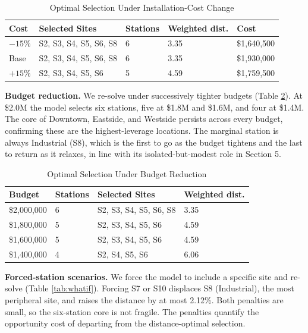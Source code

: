 \documentclass[12pt]{article}
\begin{document}
\begin{table}[H]
\centering
\caption{Optimal Selection Under Installation-Cost Change}
\label{tab:costsens}
\renewcommand{\arraystretch}{0.95}
\begin{tabular}{@{}p{}p{}p{}p{}p{}@{}}
\toprule
Cost & Selected Sites & Stations & Weighted dist. & Cost \\
\midrule
$-15\%$ & S2, S3, S4, S5, S6, S8 & 6 & 3.35 & \$1,640,500 \\
Base & S2, S3, S4, S5, S6, S8 & 6 & 3.35 & \$1,930,000 \\
$+15\%$ & S2, S3, S4, S5, S6 & 5 & 4.59 & \$1,759,500 \\
\bottomrule
\end{tabular}
\end{table}

\textbf{Budget reduction.} We re-solve under successively tighter budgets (Table
\ref{tab:budget}). At \$2.0M the model selects six stations, five at \$1.8M and \$1.6M, and
four at \$1.4M. The core of Downtown, Eastside, and Westside persists across every budget,
confirming these are the highest-leverage locations. The marginal station is always
Industrial (S8), which is the first to go as the budget tightens and the last to return as
it relaxes, in line with its isolated-but-modest role in Section 5.

\begin{table}[H]
\centering
\caption{Optimal Selection Under Budget Reduction}
\label{tab:budget}
\renewcommand{\arraystretch}{0.95}
\begin{tabular}{@{}p{}p{}p{}p{}@{}}
\toprule
Budget & Stations & Selected Sites & Weighted dist. \\
\midrule
\$2,000,000 & 6 & S2, S3, S4, S5, S6, S8 & 3.35 \\
\$1,800,000 & 5 & S2, S3, S4, S5, S6 & 4.59 \\
\$1,600,000 & 5 & S2, S3, S4, S5, S6 & 4.59 \\
\$1,400,000 & 4 & S2, S4, S5, S6 & 6.06 \\
\bottomrule
\end{tabular}
\end{table}

\textbf{Forced-station scenarios.} We force the model to include a specific site and
re-solve (Table \ref{tab:whatif}). Forcing S7 or S10 displaces S8 (Industrial), the most
peripheral site, and raises the distance by at most 2.12\%. Both penalties are small, so the
six-station core is not fragile. The penalties quantify the opportunity cost of departing
from the distance-optimal selection.
\end{document}
